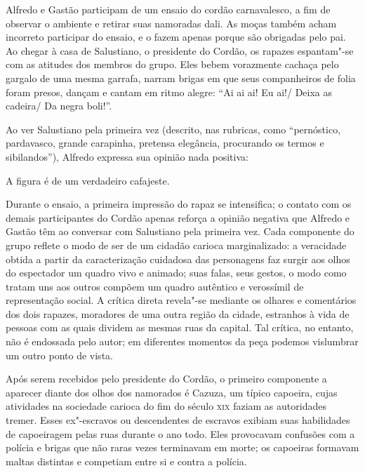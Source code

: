 Alfredo e Gastão participam de um ensaio do cordão carnavalesco, a fim
de observar o ambiente e retirar suas namoradas dali. As moças também
acham incorreto participar do ensaio, e o fazem apenas porque são
obrigadas pelo pai. Ao chegar à casa de Salustiano, o presidente do
Cordão, os rapazes espantam"-se com as atitudes dos membros do grupo.
Eles bebem vorazmente cachaça pelo gargalo de uma mesma garrafa, narram
brigas em que seus companheiros de folia foram presos, dançam e cantam
em ritmo alegre: 
``Ai ai ai! Eu ai!/
Deixa as cadeira/
Da negra boli!''.

Ao ver Salustiano pela primeira vez (descrito, nas rubricas, como
“pernóstico, pardavasco, grande carapinha, pretensa elegância,
procurando os termos e sibilandos”), Alfredo expressa sua opinião nada
positiva:

\begin{hedraquote} 
 A figura é de um verdadeiro cafajeste.
\end{hedraquote} 

Durante o ensaio, a primeira impressão do rapaz se intensifica; o
contato com os demais participantes do Cordão apenas reforça a opinião
negativa que Alfredo e Gastão têm ao conversar com Salustiano pela
primeira vez. Cada componente do grupo reflete o modo de ser de um
cidadão carioca marginalizado: a veracidade obtida a partir da
caracterização cuidadosa das personagens faz surgir aos olhos do
espectador um quadro vivo e animado; suas falas, seus gestos, o modo
como tratam uns aos outros compõem um quadro autêntico e verossímil de
representação social. A crítica direta revela"-se mediante os olhares e
comentários dos dois rapazes, moradores de uma outra região da cidade,
estranhos à vida de pessoas com as quais dividem as mesmas ruas da
capital. Tal crítica, no entanto, não é endossada pelo autor; em
diferentes momentos da peça podemos vislumbrar um outro ponto de vista.

Após serem recebidos pelo presidente do Cordão, o primeiro componente a
aparecer diante dos olhos dos namorados é Cazuza, um típico capoeira,
cujas atividades na sociedade carioca do fim do século \textsc{xix} faziam as
autoridades tremer. Esses ex"-escravos ou descendentes de escravos
exibiam suas habilidades de capoeiragem pelas ruas durante o ano todo.
Eles provocavam confusões com a polícia e brigas que não raras vezes
terminavam em morte; os capoeiras formavam maltas distintas e competiam
entre si e contra a polícia. 

